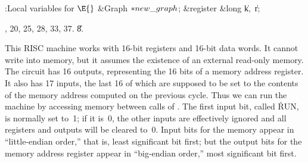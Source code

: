 \B{}:Local variables for \X${}\E{}$\6
\&{Graph} ${}{*}\\{new\_graph}{}$;\6
\&{register} \&{long} \|k${},{}$ \|r;\par
{}, 20, 25, 28, 33, 37.
\U8.\fi

This RISC machine works with 16-bit registers and 16-bit data words.
It cannot write into memory, but it assumes the existence of an
external read-only memory. The circuit has 16 outputs, representing
the 16 bits of a memory address register. It also has 17 inputs, the
last 16 of which are supposed to be set to the contents of the memory
address computed on the previous cycle. Thus we can run the machine
by accessing memory between calls of .  The first input
bit, called \.{RUN}, is normally set to~1; if it is~0, the other
inputs are effectively ignored and all registers and outputs will be
cleared to~0. Input bits for the memory appear in ``little-endian
order,'' that is, least significant bit first; but the output bits for
the memory address register appear in ``big-endian order,'' most
significant bit first.

